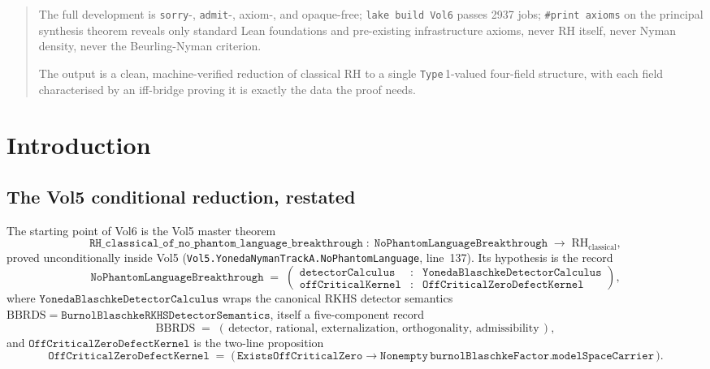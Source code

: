 \documentclass[11pt]{article}
\theoremstyle{plain}
\theoremstyle{definition}
\theoremstyle{remark}
\newcommand{\code}[1]{\texttt{#1}}
\newcommand{\BBRDS}{\mathrm{BBRDS}}
\newcommand{\RH}{\mathrm{RH}_{\mathrm{classical}}}
\begin{document}
\begin{abstract}
The full development is \code{sorry}-, \code{admit}-, axiom-, and
opaque-free; \code{lake build Vol6} passes 2937 jobs;
\code{\#print axioms} on the principal synthesis theorem reveals only
standard Lean foundations and pre-existing infrastructure axioms,
never RH itself, never Nyman density, never the Beurling-Nyman
criterion.

The output is a clean, machine-verified reduction of classical RH to a
single \code{Type}\,1-valued four-field structure, with each field
characterised by an iff-bridge proving it is exactly the data the
proof needs.
\end{abstract}

\tableofcontents
\newpage

\section{Introduction}
\label{sec:introduction}

\subsection{The Vol5 conditional reduction, restated}
\label{sec:vol5-restate}

The starting point of Vol6 is the Vol5 master theorem
\begin{equation}
  \label{eq:rh-of-breakthrough}
  \code{RH\_classical\_of\_no\_phantom\_language\_breakthrough}
    \;:\;
    \code{NoPhantomLanguageBreakthrough} \;\longrightarrow\;
    \RH,
\end{equation}
proved unconditionally inside Vol5
(\code{Vol5.YonedaNymanTrackA.NoPhantomLanguage}, line~137). Its
hypothesis is the record
\begin{equation}
  \label{eq:breakthrough-record}
  \code{NoPhantomLanguageBreakthrough} \;=\;
    \begin{pmatrix}
      \code{detectorCalculus} & : & \code{YonedaBlaschkeDetectorCalculus} \\
      \code{offCriticalKernel} & : & \code{OffCriticalZeroDefectKernel}
    \end{pmatrix},
\end{equation}
where \(\code{YonedaBlaschkeDetectorCalculus}\) wraps the canonical RKHS
detector semantics
\(\BBRDS = \code{BurnolBlaschkeRKHSDetectorSemantics}\), itself a
five-component record
\begin{equation}
  \label{eq:bbrds}
  \BBRDS \;=\;
    (\,\mathrm{detector},\,\mathrm{rational},\,\mathrm{externalization},\,
      \mathrm{orthogonality},\,\mathrm{admissibility}\,),
\end{equation}
and \(\code{OffCriticalZeroDefectKernel}\) is the two-line proposition
\begin{equation}
  \label{eq:offCriticalKernel}
  \code{OffCriticalZeroDefectKernel} \;=\;
    \bigl(\,\code{ExistsOffCriticalZero}
      \to \code{Nonempty}\,\code{burnolBlaschkeFactor.modelSpaceCarrier}\,\bigr).
\end{equation}
\end{document}
